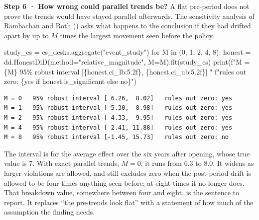 \documentclass[
  letterpaper,
  10pt,
  twoside,
  openright,
  numbers=noenddot,
  chapterprefix=true]{scrbook}
\newenvironment{Shaded}{}{}
\newcommand{\BuiltInTok}[1]{\textcolor[rgb]{0.84,0.23,0.29}{#1}}
\newcommand{\ControlFlowTok}[1]{\textcolor[rgb]{0.84,0.23,0.29}{#1}}
\newcommand{\DecValTok}[1]{\textcolor[rgb]{0.00,0.36,0.77}{#1}}
\newcommand{\KeywordTok}[1]{\textcolor[rgb]{0.84,0.23,0.29}{#1}}
\newcommand{\NormalTok}[1]{\textcolor[rgb]{0.14,0.16,0.18}{#1}}
\newcommand{\OperatorTok}[1]{\textcolor[rgb]{0.14,0.16,0.18}{#1}}
\newcommand{\SpecialCharTok}[1]{\textcolor[rgb]{0.00,0.36,0.77}{#1}}
\newcommand{\SpecialStringTok}[1]{\textcolor[rgb]{0.01,0.18,0.38}{#1}}
\newcommand{\StringTok}[1]{\textcolor[rgb]{0.01,0.18,0.38}{#1}}
\begin{document}
\textbf{Step 6 · How wrong could parallel trends be?} A flat pre-period
does not prove the trends would have stayed parallel afterwards. The
sensitivity analysis of Rambachan and Roth
() asks what happens to the conclusion
if they had drifted apart by up to \(M\) times the largest movement seen
before the policy.

\label{check-desks-honest}
\begin{Shaded}
\begin{Highlighting}[]
\NormalTok{study\_cs }\OperatorTok{=}\NormalTok{ cs\_desks.aggregate(}\StringTok{"event\_study"}\NormalTok{)}
\ControlFlowTok{for}\NormalTok{ M }\KeywordTok{in}\NormalTok{ (}\DecValTok{0}\NormalTok{, }\DecValTok{1}\NormalTok{, }\DecValTok{2}\NormalTok{, }\DecValTok{4}\NormalTok{, }\DecValTok{8}\NormalTok{):}
\NormalTok{    honest }\OperatorTok{=}\NormalTok{ dd.HonestDiD(method}\OperatorTok{=}\StringTok{"relative\_magnitude"}\NormalTok{, M}\OperatorTok{=}\NormalTok{M).fit(study\_cs)}
    \BuiltInTok{print}\NormalTok{(}\SpecialStringTok{f"M = }\SpecialCharTok{\{}\NormalTok{M}\SpecialCharTok{\}}\SpecialStringTok{   95\% robust interval [}\SpecialCharTok{\{}\NormalTok{honest}\SpecialCharTok{.}\NormalTok{ci\_lb}\SpecialCharTok{:5.2f\}}\SpecialStringTok{, }\SpecialCharTok{\{}\NormalTok{honest}\SpecialCharTok{.}\NormalTok{ci\_ub}\SpecialCharTok{:5.2f\}}\SpecialStringTok{]   "}
          \SpecialStringTok{f"rules out zero: }\SpecialCharTok{\{}\StringTok{\textquotesingle{}yes\textquotesingle{}} \ControlFlowTok{if}\NormalTok{ honest}\SpecialCharTok{.}\NormalTok{is\_significant }\ControlFlowTok{else} \StringTok{\textquotesingle{}no\textquotesingle{}}\SpecialCharTok{\}}\SpecialStringTok{"}\NormalTok{)}
\end{Highlighting}
\end{Shaded}

\begin{verbatim}
M = 0   95% robust interval [ 6.26,  8.02]   rules out zero: yes
M = 1   95% robust interval [ 5.30,  8.98]   rules out zero: yes
M = 2   95% robust interval [ 4.33,  9.95]   rules out zero: yes
M = 4   95% robust interval [ 2.41, 11.88]   rules out zero: yes
M = 8   95% robust interval [-1.45, 15.73]   rules out zero: no
\end{verbatim}

The interval is for the average effect over the six years after opening,
whose true value is 7. With exact parallel trends, \(M = 0\), it runs
from 6.3 to 8.0. It widens as larger violations are allowed, and still
excludes zero when the post-period drift is allowed to be four times
anything seen before; at eight times it no longer does. That breakdown
value, somewhere between four and eight, is the sentence to report. It
replaces ``the pre-trends look flat'' with a statement of how much of
the assumption the finding needs.
\end{document}
